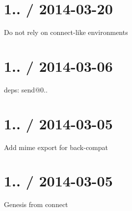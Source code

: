 \section*{1.. / 2014-\/03-\/20 }


\begin{DoxyItemize}
\item Do not rely on connect-\/like environments
\end{DoxyItemize}

\section*{1.. / 2014-\/03-\/06 }


\begin{DoxyItemize}
\item deps\+: send@0..
\end{DoxyItemize}

\section*{1.. / 2014-\/03-\/05 }


\begin{DoxyItemize}
\item Add mime export for back-\/compat
\end{DoxyItemize}

\section*{1.. / 2014-\/03-\/05 }


\begin{DoxyItemize}
\item Genesis from {\ttfamily connect} 
\end{DoxyItemize}